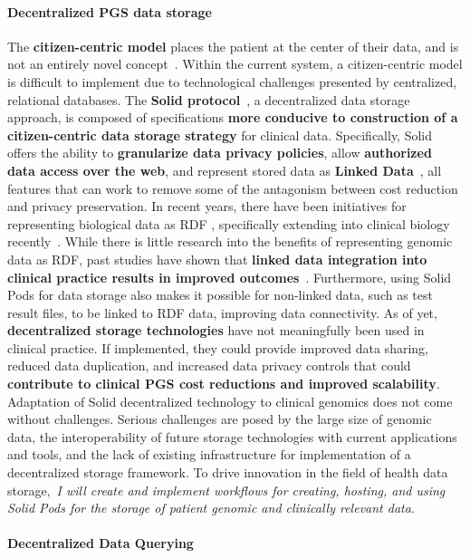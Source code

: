 \documentclass[a4paper,11pt]{article}
\begin{document}
\begin{refsection}
\paragraph{Decentralized PGS data storage}
The \textbf{citizen-centric model} places the patient at the center of their data, and is not an entirely novel concept~\cite{brands_patient-centered_2022}.
Within the current system, a citizen-centric model is difficult to implement due to technological challenges presented by centralized, relational databases.
The \textbf{Solid protocol}~\cite{solid}, a decentralized data storage approach, is composed of specifications \textbf{more conducive to construction of a citizen-centric data storage strategy} for clinical data.
Specifically, Solid offers the ability to \textbf{granularize data privacy policies}, allow \textbf{authorized data access over the web}, and represent stored data as \textbf{Linked Data}~\cite{linkeddata}, all features that can work to remove some of the antagonism between cost reduction and privacy preservation.
In recent years, there have been initiatives for representing biological data as RDF \cite{sib_rdf_2024}, specifically extending into clinical biology recently~\cite{sphn_rdf_2023}. 
While there is little research into the benefits of representing genomic data as RDF, past studies have shown that \textbf{linked data integration into clinical practice results in improved outcomes}~\cite{farinelli_linked_2015}.
Furthermore, using Solid Pods for data storage also makes it possible for non-linked data, such as test result files, to be linked to RDF data, improving data connectivity.
As of yet, \textbf{decentralized storage technologies} have not meaningfully been used in clinical practice.
If implemented, they could provide improved data sharing, reduced data duplication, and increased data privacy controls that could \textbf{contribute to clinical PGS cost reductions and improved scalability}.
Adaptation of Solid decentralized technology to clinical genomics does not come without challenges.
Serious challenges are posed by the large size of genomic data, the interoperability of future storage technologies with current applications and tools, and the lack of existing infrastructure for implementation of a decentralized storage framework.  
To drive innovation in the field of health data storage,~\emph{I will create and implement workflows for creating, hosting, and using Solid Pods for the storage of patient genomic and clinically relevant data.}


\paragraph{Decentralized Data Querying} 


\end{refsection}
\end{document}
